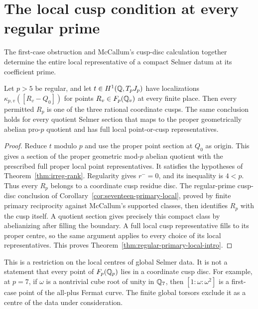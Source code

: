 \section{The local cusp condition at every regular prime}
\label{sec:all-regular-local}

The first-case obstruction and McCallum's cusp-disc calculation
together determine the entire local representative of a compact
Selmer datum at its coefficient prime.

\begin{corollary}
\label{cor:all-regular-primary-local}
Let \(p>5\) be regular, and let
\(t\in H^1(\mathbb Q,T_pJ_p)\) have localizations
\(\kappa_{p,v}([R_v-Q_0])\) for points \(R_v\in F_p(\mathbb Q_v)\)
at every finite place. Then every permitted \(R_p\) is one of
the three rational coordinate cusps. The same conclusion holds
for every quotient Selmer section that maps to the proper
geometrically abelian pro-\(p\) quotient and has full local
point-or-cusp representatives.
\end{corollary}
\begin{proof}
Reduce \(t\) modulo \(p\) and use the proper point section at
\(Q_0\) as origin. This gives a section of the proper geometric
mod-\(p\) abelian quotient with the prescribed full proper local
point representatives. It satisfies the hypotheses of
Theorem~\ref{thm:irreg-rank}. Regularity gives \(r^-=0\), and its
inequality is \(4<p\). Thus every \(R_p\) belongs to a coordinate
cusp residue disc. The regular-prime cusp-disc conclusion of
Corollary~\ref{cor:seventeen-primary-local}, proved by finite
primary reciprocity against McCallum's supported classes,
then identifies \(R_p\) with the cusp itself.
A quotient section gives precisely this compact class by
abelianizing after filling the boundary. A full local cusp
representative fills to its proper centre, so the same argument
applies to every choice of its local representatives. This proves
Theorem~\ref{thm:regular-primary-local-intro}.
\end{proof}

This is a restriction on the local centres of global Selmer data.
It is not a statement that every point of \(F_p(\mathbb Q_p)\) lies in a
coordinate cusp disc. For example, at \(p=7\), if \(\omega\) is
a nontrivial cube root of unity in \(\mathbb Q_7\), then
\([1:\omega:\omega^2]\) is a first-case point of the all-plus
Fermat curve. The finite global torsors exclude it as a centre
of the data under consideration.
